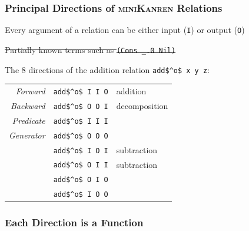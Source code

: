\documentclass[xcolor=table, aspectratio=169]{beamer}
\newcommand{\makenote}[1]{\hfill \footnotesize{#1}}
\newcommand{\strikeoutnote}[1]{\makenote{\strikethrough{#1}}}
\newcommand{\strikethrough}[1]{\sout{#1}}
\newcommand{\mk}{\textsc{miniKanren}\xspace}
\begin{document}
\begin{frame}[fragile]
  \frametitle{Principal Directions of \mk Relations}
\begin{center}
  Every argument of a relation can be either input (\lstinline{I}) or output (\lstinline{O})

\vfill

  \strikeoutnote{Partially known terms such as \lstinline{(Cons _.0 Nil)}}
\end{center}

\vfill

\begin{center}
  The 8 directions of the addition relation \lstinline{add$^o$ x y z}:
\end{center}

\begin{center}
\begin{tabular}{rll}
  \emph{Forward}   & \lstinline|add$^o$ I I O| & addition      \\
  \emph{Backward}  & \lstinline|add$^o$ O O I| & decomposition \\
  \emph{Predicate} & \lstinline|add$^o$ I I I| &               \\
  \emph{Generator} & \lstinline|add$^o$ O O O| &               \\
                   & \lstinline|add$^o$ I O I| & subtraction   \\
                   & \lstinline|add$^o$ O I I| & subtraction   \\
                   & \lstinline|add$^o$ O I O| &               \\
                   & \lstinline|add$^o$ I O O| &
\end{tabular}
\end{center}
\end{frame}


\begin{frame}[fragile]
  \frametitle{Each Direction is a Function}
\end{frame}
\end{document}
